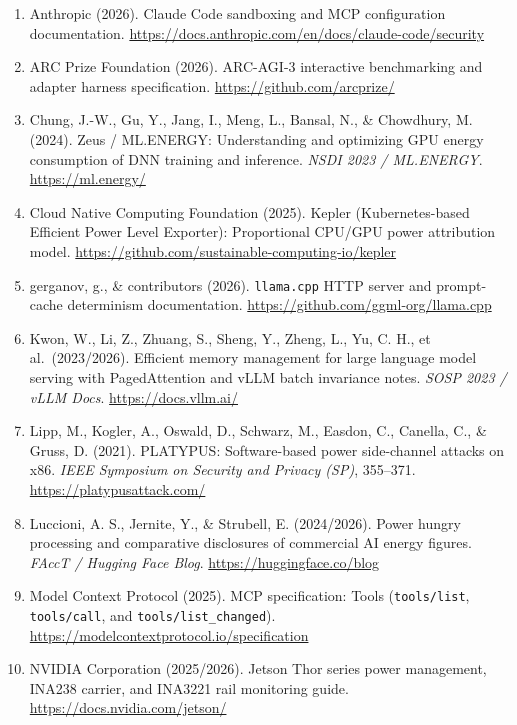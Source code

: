 \documentclass[10pt,letterpaper]{article}
\providecommand{\tightlist}{\setlength{\itemsep}{1pt}\setlength{\parskip}{0pt}}
\begin{document}
\begin{enumerate}
\def\labelenumi{\arabic{enumi}.}
\tightlist
\item
  Anthropic (2026). Claude Code sandboxing and MCP configuration
  documentation.
  \url{https://docs.anthropic.com/en/docs/claude-code/security}
\item
  ARC Prize Foundation (2026). ARC-AGI-3 interactive benchmarking and
  adapter harness specification. \url{https://github.com/arcprize/}
\item
  Chung, J.-W., Gu, Y., Jang, I., Meng, L., Bansal, N., \& Chowdhury, M.
  (2024). Zeus / ML.ENERGY: Understanding and optimizing GPU energy
  consumption of DNN training and inference. \emph{NSDI 2023 /
  ML.ENERGY}. \url{https://ml.energy/}
\item
  Cloud Native Computing Foundation (2025). Kepler (Kubernetes-based
  Efficient Power Level Exporter): Proportional CPU/GPU power
  attribution model.
  \url{https://github.com/sustainable-computing-io/kepler}
\item
  gerganov, g., \& contributors (2026). \texttt{llama.cpp} HTTP server
  and prompt-cache determinism documentation.
  \url{https://github.com/ggml-org/llama.cpp}
\item
  Kwon, W., Li, Z., Zhuang, S., Sheng, Y., Zheng, L., Yu, C. H., et
  al.~(2023/2026). Efficient memory management for large language model
  serving with PagedAttention and vLLM batch invariance notes.
  \emph{SOSP 2023 / vLLM Docs}. \url{https://docs.vllm.ai/}
\item
  Lipp, M., Kogler, A., Oswald, D., Schwarz, M., Easdon, C., Canella,
  C., \& Gruss, D. (2021). PLATYPUS: Software-based power side-channel
  attacks on x86. \emph{IEEE Symposium on Security and Privacy (SP)},
  355--371. \url{https://platypusattack.com/}
\item
  Luccioni, A. S., Jernite, Y., \& Strubell, E. (2024/2026). Power
  hungry processing and comparative disclosures of commercial AI energy
  figures. \emph{FAccT / Hugging Face Blog}.
  \url{https://huggingface.co/blog}
\item
  Model Context Protocol (2025). MCP specification: Tools
  (\texttt{tools/\allowbreak{}list}, \texttt{tools/\allowbreak{}call}, and
  \texttt{tools/\allowbreak{}list\_\allowbreak{}changed}).
  \url{https://modelcontextprotocol.io/specification}
\item
  NVIDIA Corporation (2025/2026). Jetson Thor series power management,
  INA238 carrier, and INA3221 rail monitoring guide.
  \url{https://docs.nvidia.com/jetson/}

\end{enumerate}
\end{document}
